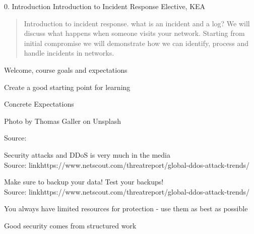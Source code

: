 \documentclass[Screen16to9,17pt]{foils}
\begin{document}
\mytitlepage
{0. Introduction}
{Introduction to Incident Response Elective, KEA}


\hlkprofiluk



\begin{quote}
Introduction to incident response. what is an incident and a log? We will discuss what happens when someone visits your network. Starting from initial compromise we will demonstrate how we can identify, process and handle incidents in networks.
\end{quote}

\begin{list2}
\item Welcome, course goals and expectations
\item Create a good starting point for learning
\item Concrete Expectations
\end{list2}


{\hfill \small Photo by Thomas Galler on Unsplash}




Source: 




Security attacks and DDoS is very much in the media\\
Source: link{https://www.netscout.com/threatreport/global-ddos-attack-trends/}




Make sure to backup your data! Test your backups!\\
Source: link{https://www.netscout.com/threatreport/global-ddos-attack-trends/}



\begin{list1}
\item You always have limited resources for protection - use them as best as possible
\item Good security comes from structured work
\end{list1}
\end{document}
